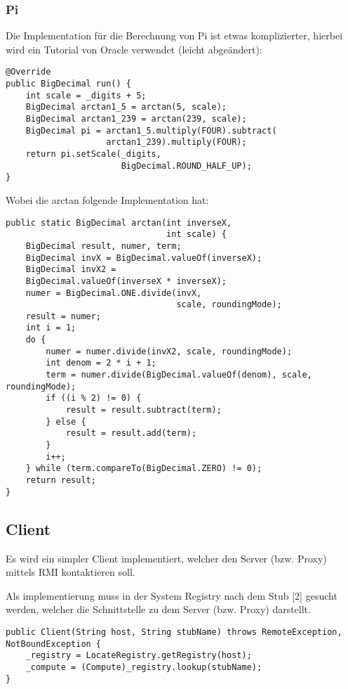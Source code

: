 \subsubsection{Pi}
Die Implementation für die Berechnung von Pi ist etwas komplizierter, hierbei wird ein Tutorial von Oracle verwendet (leicht abgeändert):

\begin{lstlisting}[style=Java, caption=Module Implementation - Pi run]
@Override
public BigDecimal run() {
	int scale = _digits + 5;
    BigDecimal arctan1_5 = arctan(5, scale);
    BigDecimal arctan1_239 = arctan(239, scale);
    BigDecimal pi = arctan1_5.multiply(FOUR).subtract(
					arctan1_239).multiply(FOUR);
    return pi.setScale(_digits,
                       BigDecimal.ROUND_HALF_UP);
}
\end{lstlisting}

Wobei die arctan folgende Implementation hat:

\begin{lstlisting}[style=Java, caption=Module Implementation - Pi arctan]
public static BigDecimal arctan(int inverseX,
                                int scale) {
	BigDecimal result, numer, term;
    BigDecimal invX = BigDecimal.valueOf(inverseX);
    BigDecimal invX2 =
    BigDecimal.valueOf(inverseX * inverseX);
	numer = BigDecimal.ONE.divide(invX,
    							  scale, roundingMode);
    result = numer;
    int i = 1;
    do {
		numer = numer.divide(invX2, scale, roundingMode);
		int denom = 2 * i + 1;
        term = numer.divide(BigDecimal.valueOf(denom), scale, roundingMode);
		if ((i % 2) != 0) {
        	result = result.subtract(term);
        } else {
            result = result.add(term);
        }
        i++;
    } while (term.compareTo(BigDecimal.ZERO) != 0);
    return result;
}
\end{lstlisting}

\subsection{Client}

Es wird ein simpler Client implementiert, welcher den Server (bzw. Proxy) mittels RMI kontaktieren soll.

Als implementierung muss in der System Registry nach dem Stub [2] gesucht werden, welcher die Schnittstelle zu dem Server (bzw. Proxy) darstellt.

\begin{lstlisting}[style=Java, caption=Client Implementation - Registry lookup]
public Client(String host, String stubName) throws RemoteException, NotBoundException {
    _registry = LocateRegistry.getRegistry(host);
    _compute = (Compute)_registry.lookup(stubName);
}
\end{lstlisting}


